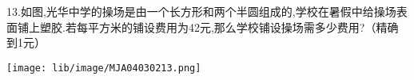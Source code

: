 13.如图,光华中学的操场是由一个长方形和两个半圆组成的,学校在暑假中给操场表面铺上塑胶.若每平方米的铺设费用为42元,那么学校铺设操场需多少费用?（精确到1元）

\begin{flushright}

    \texttt{[image: lib/image/MJA04030213.png]}

\end{flushright}



